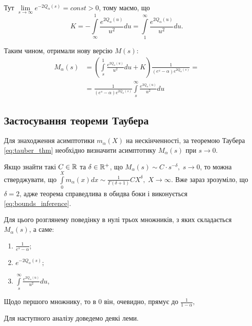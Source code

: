 Тут $\lim\limits_{s\rightarrow \infty} e^{- 2Q_\alpha(s)} = const > 0$, тому маємо, що
\begin{equation}
	K = -  \int\limits_\infty^1 \frac{e^{2Q_\alpha(u)}}{u^2} du =  \int\limits_1^\infty \frac{e^{2Q_\alpha(u)}}{u^2} du.
\end{equation}

Таким чином, отримали нову версію $M(s)$:
\begin{equation}
\begin{split}
	\label{eq:uniform_right_laplace_sol}
	M_\alpha(s)&= \left( \int\limits_s^1 \frac{e^{2Q_\alpha(u)}}{u^2} du + K \right) \frac{1}{(e^s - \alpha)  e^{2Q_\alpha(s)}}
 = \\
	&=\frac{1}{(e^s - \alpha)  e^{2Q_\alpha(s)}} \int\limits_s^\infty \frac{e^{2Q_\alpha(u)}}{u^2} du
\end{split}
\end{equation}

\subsection{Застосування теореми Таубера}

Для знаходження асимптотики $m_\alpha(X)$ на нескінченності, за теоремою Таубера \eqref{eq:tauber_thm} необхідно визначити асимптотику $M_\alpha(s)$ при $s \rightarrow 0$.

Якщо знайти такі $C \in \mathbb{R}$ та $\delta \in \mathbb{R}^+$, що $M_\alpha(s) \sim C \cdot s^{-\delta}, \; s \rightarrow 0$, то можна стверджувати, що $\int\limits_0^X m_\alpha(x) dx \sim \frac{1}{\Gamma(\delta + 1)} C X^\delta, \; X \rightarrow \infty$. Вже зараз зрозуміло, що $\delta = 2$, адже теорема справедлива в обидва боки і виконується \eqref{eq:bounds_inference}.

Для цього розглянему поведінку в нулі трьох множників, з яких складається $M_\alpha(s)$, а саме:
\begin{enumerate}
	\item $\frac{1}{e^s - \alpha}$;
	\item $e^{-2Q_\alpha(s)}$;
	\item $\int\limits_s^\infty \frac{e^{2Q_\alpha(u)}}{u^2} du$,
\end{enumerate}

Щодо першого множнику, то в 0 він, очевидно, прямує до $\frac{1}{1-\alpha}$,

Для наступного аналізу доведемо деякі леми.

